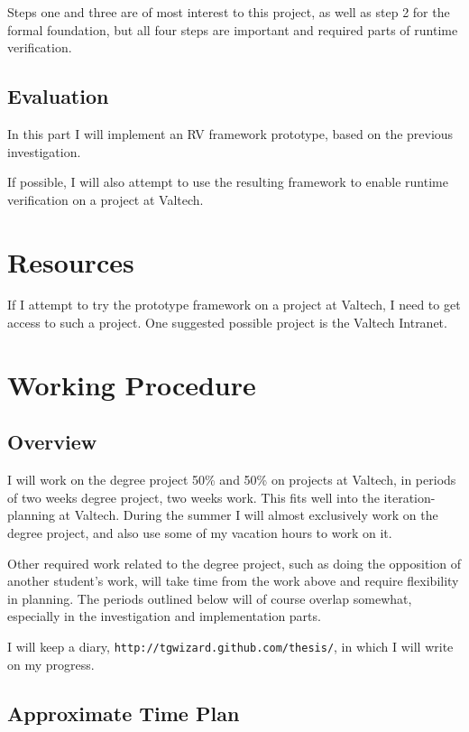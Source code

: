 \documentclass[a4paper,11pt]{article}
\begin{document}
Steps one and three are of most interest to this project, as well as step 2 for the formal foundation, but all four steps are important and required parts of runtime verification.


\subsection{Evaluation}

In this part I will implement an RV framework prototype, based on the previous
investigation.

If possible, I will also attempt to use the resulting framework to enable runtime verification on a project at Valtech.


\section{Resources}

If I attempt to try the prototype framework on a project at Valtech, I need to get access to such a project. One suggested possible project is the Valtech Intranet.


\section{Working Procedure}

\subsection{Overview}

I will work on the degree project 50\% and 50\% on projects at Valtech, in periods of
two weeks degree project, two weeks work. This fits well into the iteration-planning at
Valtech. During the summer I will almost exclusively work on the degree project, and also
use some of my vacation hours to work on it.

Other required work related to the degree project, such as doing the opposition of
another student's work, will take time from the work above and require
flexibility in planning. The periods outlined below will of course overlap
somewhat, especially in the investigation and implementation parts.

I will keep a diary, \texttt{http://tgwizard.github.com/thesis/}, in which I will write on my progress. 

\subsection{Approximate Time Plan}
\end{document}
